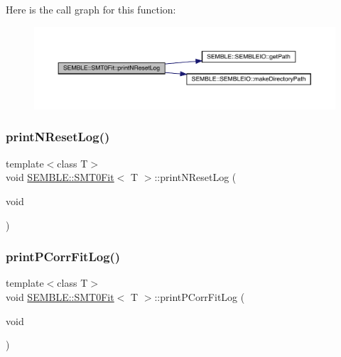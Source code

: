 Here is the call graph for this function\+:
\nopagebreak
\begin{figure}[H]
\begin{center}
\leavevmode
\includegraphics[width=350pt]{d6/dad/structSEMBLE_1_1SMT0Fit_a45f5b6b87ab4828a73de4150eec496b1_cgraph}
\end{center}
\end{figure}
\mbox{\label{structSEMBLE_1_1SMT0Fit_a45f5b6b87ab4828a73de4150eec496b1}} 
\subsubsection{\texorpdfstring{printNResetLog()}{printNResetLog()}\hspace{0.1cm}{\footnotesize\ttfamily [2/2]}}
{\footnotesize\ttfamily template$<$class T$>$ \\
void \mbox{\hyperlink{structSEMBLE_1_1SMT0Fit}{S\+E\+M\+B\+L\+E\+::\+S\+M\+T0\+Fit}}$<$ T $>$\+::print\+N\+Reset\+Log (\begin{DoxyParamCaption}\item[{void}]{ }\end{DoxyParamCaption})}

\mbox{\label{structSEMBLE_1_1SMT0Fit_a7553e4903f0646d0382dd9335cee52be}} 
\subsubsection{\texorpdfstring{printPCorrFitLog()}{printPCorrFitLog()}\hspace{0.1cm}{\footnotesize\ttfamily [1/2]}}
{\footnotesize\ttfamily template$<$class T$>$ \\
void \mbox{\hyperlink{structSEMBLE_1_1SMT0Fit}{S\+E\+M\+B\+L\+E\+::\+S\+M\+T0\+Fit}}$<$ T $>$\+::print\+P\+Corr\+Fit\+Log (\begin{DoxyParamCaption}\item[{void}]{ }\end{DoxyParamCaption})}

